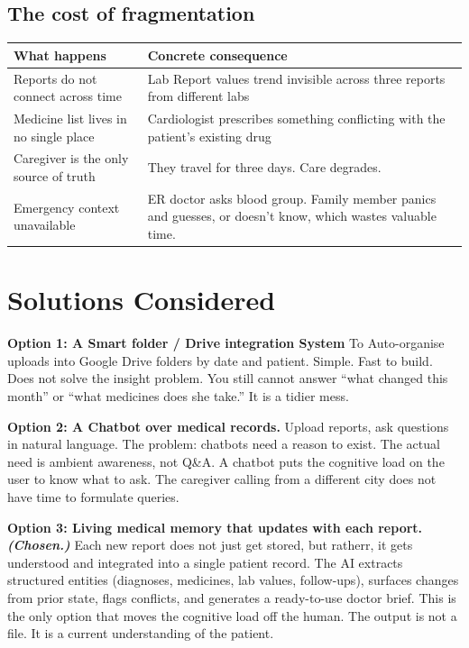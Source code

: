 \documentclass[11pt, a4paper]{article}
\begin{document}
\subsection{The cost of fragmentation}

\vspace{4pt}
\begin{tabularx}{\linewidth}{@{}L{6.2cm} X@{}}
\toprule
\textbf{What happens} & \textbf{Concrete consequence} \\
\midrule
Reports do not connect across time & Lab Report values trend invisible across three reports from different labs \\
Medicine list lives in no single place & Cardiologist prescribes something conflicting with the patient's existing drug \\
Caregiver is the only source of truth & They travel for three days. Care degrades. \\
Emergency context unavailable & ER doctor asks blood group. Family member panics and guesses, or doesn't know, which wastes valuable time. \\
\bottomrule
\end{tabularx}

\section{Solutions Considered}

\textbf{Option 1: A Smart folder / Drive integration System}
To Auto-organise uploads into Google Drive folders by date and patient. Simple. Fast to build. Does not solve the insight problem. You still cannot answer ``what changed this month'' or ``what medicines does she take.'' It is a tidier mess.

\textbf{Option 2: A Chatbot over medical records.}
Upload reports, ask questions in natural language. The problem: chatbots need a reason to exist. The actual need is ambient awareness, not Q\&A. A chatbot puts the cognitive load on the user to know what to ask. The caregiver calling from a different city does not have time to formulate queries.

\textbf{Option 3: Living medical memory that updates with each report. \textit{(Chosen.)}}
Each new report does not just get stored, but ratherr, it gets understood and integrated into a single patient record. The AI extracts structured entities (diagnoses, medicines, lab values, follow-ups), surfaces changes from prior state, flags conflicts, and generates a ready-to-use doctor brief. This is the only option that moves the cognitive load off the human. The output is not a file. It is a current understanding of the patient.
\end{document}
